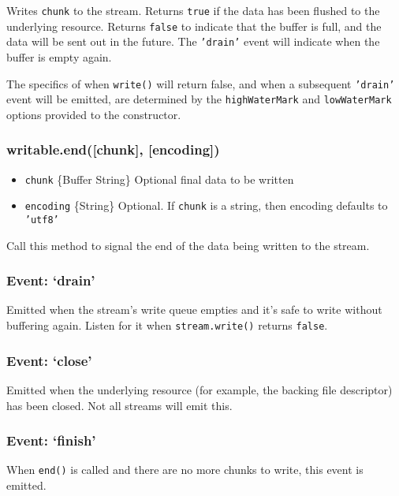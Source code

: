 Writes \texttt{chunk} to the stream. Returns \texttt{true} if the data
has been flushed to the underlying resource. Returns \texttt{false} to
indicate that the buffer is full, and the data will be sent out in the
future. The \texttt{'drain'} event will indicate when the buffer is
empty again.

The specifics of when \texttt{write()} will return false, and when a
subsequent \texttt{'drain'} event will be emitted, are determined by the
\texttt{highWaterMark} and \texttt{lowWaterMark} options provided to the
constructor.

\subsubsection{writable.end({[}chunk{]}, {[}encoding{]})}

\begin{itemize}
\item
  \texttt{chunk} \{Buffer \textbar{} String\} Optional final data to be
  written
\item
  \texttt{encoding} \{String\} Optional. If \texttt{chunk} is a string,
  then encoding defaults to \texttt{'utf8'}
\end{itemize}

Call this method to signal the end of the data being written to the
stream.

\subsubsection{Event: `drain'}

Emitted when the stream's write queue empties and it's safe to write
without buffering again. Listen for it when \texttt{stream.write()}
returns \texttt{false}.

\subsubsection{Event: `close'}

Emitted when the underlying resource (for example, the backing file
descriptor) has been closed. Not all streams will emit this.

\subsubsection{Event: `finish'}

When \texttt{end()} is called and there are no more chunks to write,
this event is emitted.

